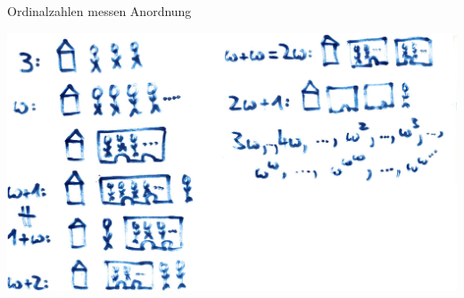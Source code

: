 \documentclass[12pt,compress,ngerman,utf8,t]{beamer}
\begin{document}
\begin{frame}{Ordinalzahlen messen Anordnung}
  \begin{center}
    \includegraphics[width=\textwidth]{images/ordinal-intuition}
  \end{center}
\end{frame}

\end{document}
